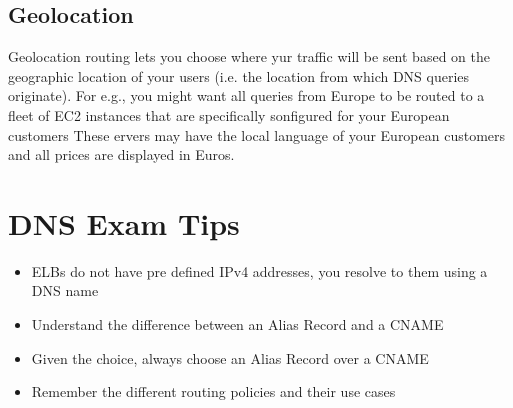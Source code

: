 \documentclass{article}
\begin{document}
\subsection{Geolocation}
Geolocation routing lets you choose where yur traffic will be sent based on the geographic location of your users (i.e. the location from which DNS queries originate). For e.g., you might want all queries from Europe to be routed to a fleet of EC2 instances that are specifically sonfigured for your European customers These ervers may have the local language of your European customers and all prices are displayed in Euros.

\section{DNS Exam Tips}
\begin{itemize}
\item
ELBs do not have pre defined IPv4 addresses, you resolve to them using a DNS name

\item
Understand the difference between an Alias Record and a CNAME

\item
Given the choice, always choose an Alias Record over a CNAME

\item
Remember the different routing policies and their use cases
\end{itemize}
\end{document}
